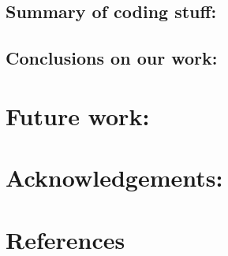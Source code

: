 \documentclass{article}
\begin{document}
\subsection{Summary of coding stuff:}

\subsection{Conclusions on our work:}

\section{Future work:}

\section{Acknowledgements:}


\section{References}
\printbibliography
\end{document}
